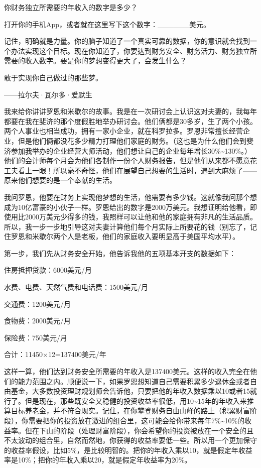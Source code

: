 你财务独立所需要的年收入的数字是多少？

打开你的手机App，或者就在这里写下这个数字：\_\_\_\_\_\_美元。

记住，明确就是力量。你的脑子知道了一个真实可靠的数据，你的意识就会找到一个办法实现这个目标。现在你知道了，你要达到财务安全、财务活力、财务独立所需要的收入数字。要是你的梦想变得更大了，会发生什么？

\begin{BookQuote}
敢于实现你自己做过的那些梦。

\hfill ——拉尔夫·瓦尔多·爱默生
\end{BookQuote}

我来给你讲讲罗恩和米歇尔的故事。我是在一次研讨会上认识这对夫妻的，我每年都要在我在斐济的那个度假胜地举办研讨会。他们俩都是30多岁，生了两个小孩。两个人事业也相当成功，拥有一家小企业，就在科罗拉多。罗恩非常擅长经营企业，但是他们俩都没花多少精力打理他们家庭的财务。（这也是为什么他们会到斐济参加我举办的企业经营大师活动，他们想让自己的企业每年增长30\%\textasciitilde{}130\%。）他们的会计师每个月会为他们各制作一份个人财务报告，但是他们从来都不愿意花工夫看上一眼！所以毫不奇怪，他们在展望自己想要的生活时，遇到大麻烦了——原来他们想要的是一个奉献的生活。

我问罗恩，他要在财务上实现他梦想的生活，他需要有多少钱。这就像我问那个想成为10亿富豪的小伙子一样。罗恩给出的数字是2000万美元。我想证明给他看，即使用比2000万美元少得多的钱，我照样可以让他和他的家庭拥有非凡的生活品质。所以，我一步一步地引导这对夫妻计算他们每个月实际上所要花的钱（别忘了，记住罗恩和米歇尔两个人是老板，他们的家庭收入要明显高于美国平均水平）。

第一步，我们先从财务安全开始，他告诉我他的五项基本开支的数据如下：

住房抵押贷款：6000美元/月

水费、电费、天然气费和电话费：1500美元/月

交通费：1200美元/月

食物费：2000美元/月

保险费：750美元/月

合计：11450×12=137400美元/年

这样一算，他们达到财务安全所需要的年收入是137400美元。这样的收入完全在他们的能力范围之内。顺便说一下，如果罗恩想知道自己需要积累多少退休金或者自由基金，大多数投资理财规划师会告诉他，只要把他的年收入数据乘以10或者15就行了。但是现在，那些既安全又稳健的投资收益率很低，用10\textasciitilde{}15年的年收入来推算目标养老金，并不符合现实。记住，在你攀登财务自由山峰的路上（积累财富阶段），你需要把你的投资放在激进的组合里，这可能会给你带来每年7\%\textasciitilde{}10\%的收益率。但在下山的阶段（处理财富阶段），你会希望你的投资被放在一个安全的且不太波动的组合里，自然而然地，你获得的收益率要低一些。所以用一个更加保守的收益率假设，比如5\%，是比较明智的。把你的年收入乘以10，就是假定年收益率是10\%；把你的年收入乘以20，就是假定年收益率为20\%。

